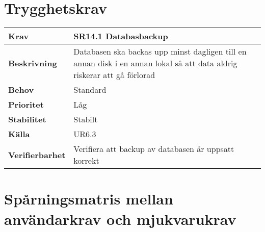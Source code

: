 \documentclass[a4paper, twoside, 11pt, titlepage]{article}
\begin{document}
\clearpage
\section{Trygghetskrav}


\begin{tabular} { p{2.6cm} p{12.5cm} }
	\hline
	\sffamily\textbf{Krav} & \sffamily\textbf{SR14.1 Databasbackup } \\
	\hline
	\sffamily\textbf{Beskrivning} & Databasen ska backas upp minst dagligen till en annan disk i en annan lokal så att data aldrig riskerar att gå förlorad  \\
	\hline
	\sffamily\textbf{Behov} & Standard  \\
	\hline
	\sffamily\textbf{Prioritet} & Låg  \\
	\hline
	\sffamily\textbf{Stabilitet} & Stabilt  \\
	\hline
	\sffamily\textbf{Källa} & UR6.3  \\
	\hline
	\sffamily\textbf{Verifierbarhet} & Verifiera att backup av databasen är uppsatt korrekt  \\
	\hline
\end{tabular}


\clearpage
\section{Spårningsmatris mellan användarkrav och mjukvarukrav}
\end{document}
